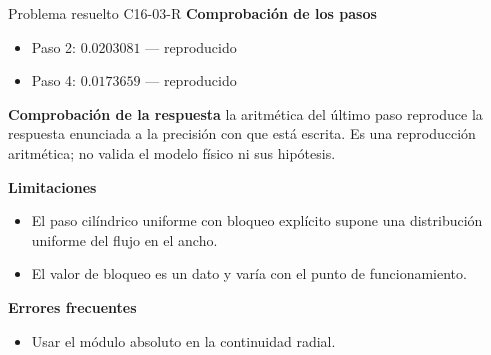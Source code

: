 \documentclass[10pt,openany]{book}
\begin{document}
\begin{studiumworked}{Problema resuelto C16-03-R}
\noindent\textbf{Comprobación de los pasos}
\begin{itemize}
\item Paso 2: $0.0203081$ — reproducido
\item Paso 4: $0.0173659$ — reproducido
\end{itemize}

\noindent\textbf{Comprobación de la respuesta} la aritmética del último paso reproduce la respuesta enunciada a la precisión con que está escrita. Es una reproducción aritmética; no valida el modelo físico ni sus hipótesis.

\noindent\textbf{Limitaciones}
\begin{itemize}
\item El paso cilíndrico uniforme con bloqueo explícito supone una distribución uniforme del flujo en el ancho.
\item El valor de bloqueo es un dato y varía con el punto de funcionamiento.
\end{itemize}

\noindent\textbf{Errores frecuentes}
\begin{itemize}
\item Usar el módulo absoluto en la continuidad radial.
\end{itemize}
\end{studiumworked}
\end{document}
